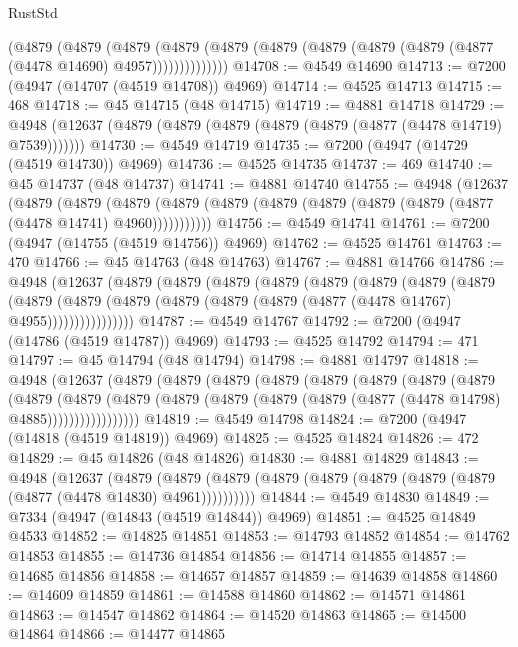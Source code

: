 \begin{lexlean}{RustStd}
\begin{coremodule}
{\begin{coremodule}
{{{{{{{{{{{{{{{{{{{{{{{{{{{{{{{{{{{{{{{{{{{{{{{{{{{{{{{{{{{{            (@4879
              (@4879
                (@4879
                  (@4879
                    (@4879 (@4879 (@4879 (@4879 (@4879 (@4877 (@4478 @14690) @4957))))))))))))))
@14708 := @4549 @14690
@14713 := @7200 (@4947 (@14707 (@4519 @14708)) @4969)
@14714 := @4525 @14713
@14715 := 468
@14718 := @45 @14715 (@48 @14715)
@14719 := @4881 @14718
@14729 := @4948 (@12637 (@4879 (@4879 (@4879 (@4879 (@4879 (@4877 (@4478 @14719) @7539)))))))
@14730 := @4549 @14719
@14735 := @7200 (@4947 (@14729 (@4519 @14730)) @4969)
@14736 := @4525 @14735
@14737 := 469
@14740 := @45 @14737 (@48 @14737)
@14741 := @4881 @14740
@14755 := @4948
    (@12637
      (@4879
        (@4879
          (@4879 (@4879 (@4879 (@4879 (@4879 (@4879 (@4879 (@4877 (@4478 @14741) @4960)))))))))))
@14756 := @4549 @14741
@14761 := @7200 (@4947 (@14755 (@4519 @14756)) @4969)
@14762 := @4525 @14761
@14763 := 470
@14766 := @45 @14763 (@48 @14763)
@14767 := @4881 @14766
@14786 := @4948
    (@12637
      (@4879
        (@4879
          (@4879
            (@4879
              (@4879
                (@4879
                  (@4879
                    (@4879
                      (@4879
                        (@4879
                          (@4879 (@4879 (@4879 (@4879 (@4877 (@4478 @14767) @4955))))))))))))))))
@14787 := @4549 @14767
@14792 := @7200 (@4947 (@14786 (@4519 @14787)) @4969)
@14793 := @4525 @14792
@14794 := 471
@14797 := @45 @14794 (@48 @14794)
@14798 := @4881 @14797
@14818 := @4948
    (@12637
      (@4879
        (@4879
          (@4879
            (@4879
              (@4879
                (@4879
                  (@4879
                    (@4879
                      (@4879
                        (@4879
                          (@4879
                            (@4879 (@4879 (@4879 (@4879 (@4877 (@4478 @14798) @4885)))))))))))))))))
@14819 := @4549 @14798
@14824 := @7200 (@4947 (@14818 (@4519 @14819)) @4969)
@14825 := @4525 @14824
@14826 := 472
@14829 := @45 @14826 (@48 @14826)
@14830 := @4881 @14829
@14843 := @4948
    (@12637
      (@4879 (@4879 (@4879 (@4879 (@4879 (@4879 (@4879 (@4879 (@4877 (@4478 @14830) @4961))))))))))
@14844 := @4549 @14830
@14849 := @7334 (@4947 (@14843 (@4519 @14844)) @4969)
@14851 := @4525 @14849 @4533
@14852 := @14825 @14851
@14853 := @14793 @14852
@14854 := @14762 @14853
@14855 := @14736 @14854
@14856 := @14714 @14855
@14857 := @14685 @14856
@14858 := @14657 @14857
@14859 := @14639 @14858
@14860 := @14609 @14859
@14861 := @14588 @14860
@14862 := @14571 @14861
@14863 := @14547 @14862
@14864 := @14520 @14863
@14865 := @14500 @14864
@14866 := @14477 @14865
}}}}}}}}}}}}}}}}}}}}}}}}}}}}}}}}}}}}}}}}}}}}}}}}}}}}}}}}}}}}
\end{coremodule}}
\end{coremodule}
\end{lexlean}
